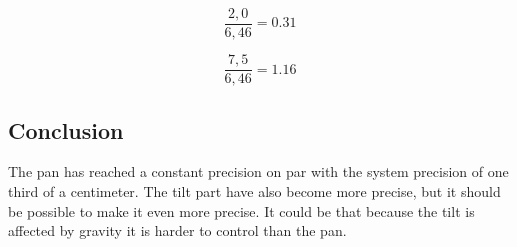 \[ \frac{2,0}{6,46} = 0.31 \]

\[ \frac{7,5}{6,46} = 1.16 \]

\subsection*{Conclusion}
The pan has reached a constant precision on par with the system precision
of one third of a centimeter. The tilt part have also become more precise, but
it should be possible to make it even more precise. It could be that because the
tilt is affected by gravity it is harder to control than the pan.


